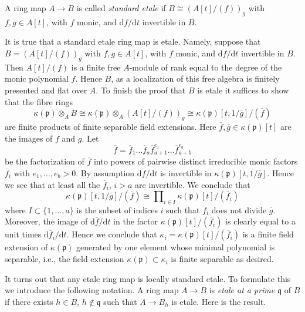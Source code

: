 \begin{definition}
\label{definition-standard-etale}
A ring map $A \to B$ is called {\it standard etale} if
$B \cong \left(A[t]/(f)\right)_{g}$ with $f, g \in A[t]$, with $f$ monic,
and $\text{d}f/\text{d}t$ invertible in $B$.
\end{definition}

\noindent
It is true that a standard etale ring map is etale. Namely, suppose
that $B = \left(A[t]/(f)\right)_{g}$ with $f, g \in A[t]$, with $f$ monic,
and $\text{d}f/\text{d}t$ invertible in $B$. Then $A[t]/(f)$ is a finite
free $A$-module of rank equal to the degree of the monic polynomial $f$.
Hence $B$, as a localization of this free algebra is finitely presented
and flat over $A$. To finish the proof that $B$ is etale it suffices
to show that the fibre rings
$$
\kappa(\mathfrak p) \otimes_A B
\cong
\kappa(\mathfrak p) \otimes_A (A[t]/(f))_g
\cong
\kappa(\mathfrak p)[t, 1/\overline{g}]/(\overline{f})
$$
are finite products of finite separable field extensions.
Here $\overline{f}, \overline{g} \in \kappa(\mathfrak p)[t]$ are
the images of $f$ and $g$. Let
$$
\overline{f} = \overline{f}_1 \ldots \overline{f}_a
\overline{f}_{a + 1}^{e_1} \ldots \overline{f}_{a + b}^{e_b}
$$
be the factorization of $\overline{f}$ into powers of pairwise distinct
irreducible monic factors $\overline{f}_i$ with $e_1, \ldots, e_b > 0$.
By assumption $\text{d}\overline{f}/\text{d}t$ is invertible in
$\kappa(\mathfrak p)[t, 1/\overline{g}]$. Hence we see that
at least all the $\overline{f}_i$, $i > a$ are invertible. We conclude
that
$$
\kappa(\mathfrak p)[t, 1/\overline{g}]/(\overline{f})
\cong
\prod\nolimits_{i \in I} \kappa(\mathfrak p)[t]/(\overline{f}_i)
$$
where $I \subset \{1, \ldots, a\}$ is the subset of indices $i$ such that
$\overline{f}_i$ does not divide $\overline{g}$. Moreover, the image of
$\text{d}\overline{f}/\text{d}t$ in the factor
$\kappa(\mathfrak p)[t]/(\overline{f}_i)$ is clearly equal to a
unit times $\text{d}\overline{f}_i/\text{d}t$. Hence we conclude that
$\kappa_i = \kappa(\mathfrak p)[t]/(\overline{f}_i)$ is a finite field
extension of $\kappa(\mathfrak p)$ generated by one element whose
minimal polynomial is separable, i.e., the field extension
$\kappa(\mathfrak p) \subset \kappa_i$ is finite separable as desired.

\medskip\noindent
It turns out that any etale ring map is locally standard etale.
To formulate this we introduce the following notation.
A ring map $A \to B$ is {\it etale at a prime $\mathfrak q$} of $B$ if there
exists $h \in B$, $h \not \in \mathfrak q$ such that $A \to B_h$ is etale.
Here is the result.

